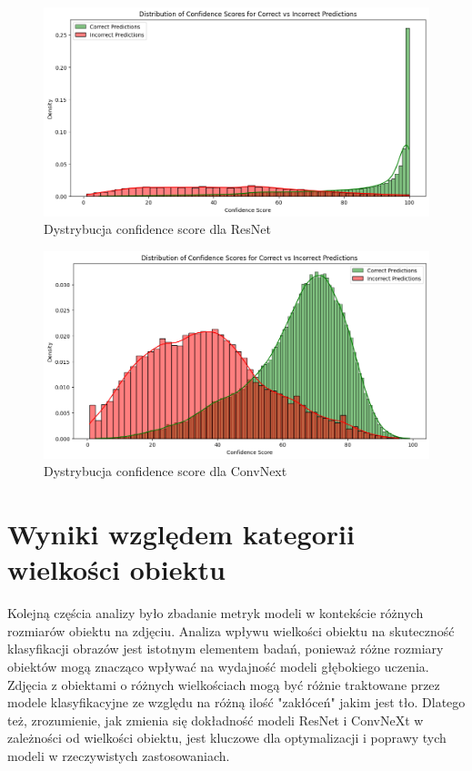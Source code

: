 \begin{figure}
	\centering\includegraphics[width=.9\textwidth]{img/resnet_conf_distro}
	\caption{Dystrybucja confidence score dla ResNet}
	\label{rys:res_c_distro}
\end{figure}

\begin{figure}
	\centering\includegraphics[width=.9\textwidth]{img/convnext_conf_distro}
	\caption{Dystrybucja confidence score dla ConvNext}
	\label{rys:conv_c_distro}
\end{figure}
\newpage

\section*{Wyniki względem kategorii wielkości obiektu}

Kolejną częścia analizy było zbadanie metryk modeli w kontekście różnych rozmiarów obiektu na zdjęciu. Analiza wpływu wielkości obiektu na skuteczność klasyfikacji obrazów jest istotnym elementem badań, ponieważ różne rozmiary obiektów mogą 
znacząco wpływać na wydajność modeli głębokiego uczenia. Zdjęcia z obiektami o różnych wielkościach mogą być różnie traktowane przez modele klasyfikacyjne ze względu na różną ilość "zakłóceń" jakim jest tło. Dlatego też, zrozumienie, jak 
zmienia się dokładność modeli ResNet i ConvNeXt w zależności od wielkości obiektu, jest kluczowe dla optymalizacji i poprawy tych modeli w rzeczywistych zastosowaniach.



